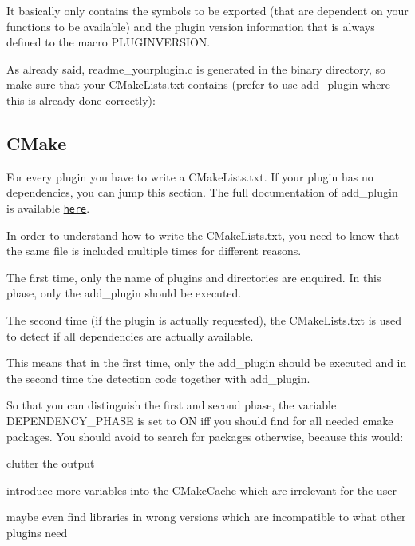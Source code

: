 It basically only contains the symbols to be exported (that are dependent on your functions to be available) and the plugin version information that is always defined to the macro P\+L\+U\+G\+I\+N\+V\+E\+R\+S\+I\+O\+N.

As already said, readme\+\_\+yourplugin.\+c is generated in the binary directory, so make sure that your C\+Make\+Lists.\+txt contains (prefer to use add\+\_\+plugin where this is already done correctly)\+: 


\subsection*{C\+Make}

For every plugin you have to write a C\+Make\+Lists.\+txt. If your plugin has no dependencies, you can jump this section. The full documentation of {\ttfamily add\+\_\+plugin} is available \href{/home/markus/Projekte/Elektra/current/cmake/Modules/LibAddPlugin.cmake}{\tt here}.

In order to understand how to write the C\+Make\+Lists.\+txt, you need to know that the same file is included multiple times for different reasons.


\begin{DoxyEnumerate}
\item The first time, only the name of plugins and directories are enquired. In this phase, only the {\ttfamily add\+\_\+plugin} should be executed.
\item The second time (if the plugin is actually requested), the C\+Make\+Lists.\+txt is used to detect if all dependencies are actually available.
\end{DoxyEnumerate}

This means that in the first time, only the {\ttfamily add\+\_\+plugin} should be executed and in the second time the detection code together with {\ttfamily add\+\_\+plugin}.

So that you can distinguish the first and second phase, the variable {\ttfamily D\+E\+P\+E\+N\+D\+E\+N\+C\+Y\+\_\+\+P\+H\+A\+S\+E} is set to {\ttfamily O\+N} iff you should find for all needed cmake packages. You should avoid to search for packages otherwise, because this would\+:


\begin{DoxyItemize}
\item clutter the output
\item introduce more variables into the C\+Make\+Cache which are irrelevant for the user
\item maybe even find libraries in wrong versions which are incompatible to what other plugins need
\end{DoxyItemize}

